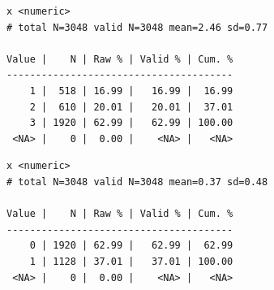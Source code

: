 \documentclass[
  letterpaper,
  DIV=11,
  numbers=noendperiod]{scrreprt}
\newenvironment{Shaded}{\begin{snugshade}}{\end{snugshade}}
\newcommand{\AttributeTok}[1]{\textcolor[rgb]{0.40,0.45,0.13}{#1}}
\newcommand{\CommentTok}[1]{\textcolor[rgb]{0.37,0.37,0.37}{#1}}
\newcommand{\DecValTok}[1]{\textcolor[rgb]{0.68,0.00,0.00}{#1}}
\newcommand{\FunctionTok}[1]{\textcolor[rgb]{0.28,0.35,0.67}{#1}}
\newcommand{\NormalTok}[1]{\textcolor[rgb]{0.00,0.23,0.31}{#1}}
\newcommand{\OtherTok}[1]{\textcolor[rgb]{0.00,0.23,0.31}{#1}}
\newcommand{\SpecialCharTok}[1]{\textcolor[rgb]{0.37,0.37,0.37}{#1}}
\begin{document}
\begin{Shaded}
\end{Shaded}

\begin{verbatim}
x <numeric> 
# total N=3048 valid N=3048 mean=2.46 sd=0.77

Value |    N | Raw % | Valid % | Cum. %
---------------------------------------
    1 |  518 | 16.99 |   16.99 |  16.99
    2 |  610 | 20.01 |   20.01 |  37.01
    3 | 1920 | 62.99 |   62.99 | 100.00
 <NA> |    0 |  0.00 |    <NA> |   <NA>
\end{verbatim}

\begin{Shaded}
\end{Shaded}

\begin{verbatim}
x <numeric> 
# total N=3048 valid N=3048 mean=0.37 sd=0.48

Value |    N | Raw % | Valid % | Cum. %
---------------------------------------
    0 | 1920 | 62.99 |   62.99 |  62.99
    1 | 1128 | 37.01 |   37.01 | 100.00
 <NA> |    0 |  0.00 |    <NA> |   <NA>
\end{verbatim}
\end{document}
